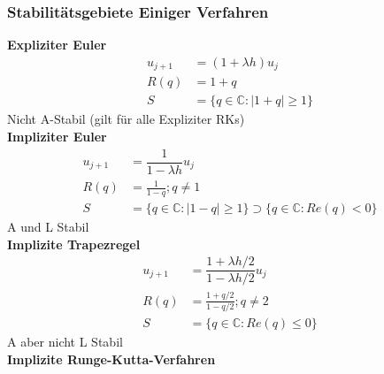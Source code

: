 \documentclass[
	ngerman,
	accentcolor=9c,%
	type=intern,
	marginpar=false
	]{tudapub}
\begin{document}
        \subsubsection{Stabilitätsgebiete Einiger Verfahren}
            \textbf{Expliziter Euler}
            \begin{align*}
                u_{j+1} &= (1+ \lambda h )u_j\\
                R(q) &= 1+q\\
                S&=\{q \in \mathbb{C} : |1+q| \geq 1\}
            \end{align*}
            Nicht A-Stabil (gilt für alle Expliziter RKs)\\[1ex]
            \textbf{Impliziter Euler}
            \begin{align*}
                u_{j+1} &= \dfrac{1}{1-\lambda h} u_j\\
                R(q) &= \frac{1}{1-q}; q \not = 1\\
                S&=\{q \in \mathbb{C} : |1-q| \geq 1\} \supset \{q \in \mathbb{C}: Re(q) <0 \}
            \end{align*}
            A und L Stabil\\[1ex]
            \textbf{Implizite Trapezregel}
            \begin{align*}
                u_{j+1} &= \dfrac{1 + \lambda h /2 }{1-\lambda h /2 } u_j\\
                R(q) &= \frac{1+q/2}{1-q/2}; q \not = 2\\
                S&= \{q \in \mathbb{C}: Re(q)  \leq 0 \}
            \end{align*}
            A aber nicht L Stabil\\[1ex]
            \textbf{Implizite Runge-Kutta-Verfahren}\\
\end{document}
